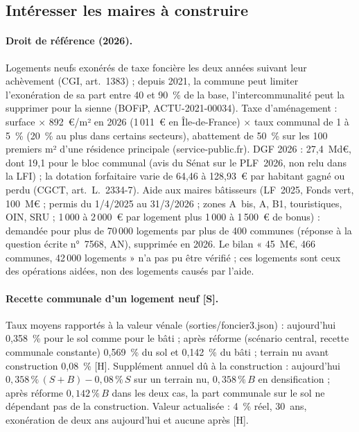 \subsection{Intéresser les maires à construire}\label{ann:pal-maires}

\paragraph{Droit de référence (2026).} Logements neufs exonérés de taxe foncière les deux années suivant leur
achèvement (CGI, art.~1383) ; depuis 2021, la commune peut limiter l'exonération de sa part entre 40 et 90~\% de la
base, l'intercommunalité peut la supprimer pour la sienne (BOFiP, ACTU-2021-00034). Taxe d'aménagement : surface
$\times$ 892~€/m² en 2026 (1\,011~€ en Île-de-France) $\times$ taux communal de 1 à 5~\% (20~\% au plus dans certains
secteurs), abattement de 50~\% sur les 100 premiers m² d'une résidence principale (service-public.fr). DGF 2026 :
27,4~Md€, dont 19,1 pour le bloc communal (avis du Sénat sur le PLF~2026, non relu dans la LFI) ; la dotation forfaitaire
varie de 64,46 à 128,93~€ par habitant gagné ou perdu (CGCT, art.~L.~2334-7). Aide aux maires bâtisseurs (LF~2025,
Fonds vert, 100~M€ ; permis du 1/4/2025 au 31/3/2026 ; zones A~bis, A, B1, touristiques, OIN, SRU ; 1\,000 à 2\,000~€
par logement plus 1\,000 à 1\,500~€ de bonus) : demandée pour plus de 70\,000 logements par plus de 400 communes
(réponse à la question écrite n°~7568, AN), supprimée en 2026. Le bilan « 45~M€, 466 communes, 42\,000 logements » n'a
pas pu être vérifié ; ces logements sont ceux des opérations aidées, non des logements causés par l'aide.

\paragraph{Recette communale d'un logement neuf [S].} Taux moyens rapportés à la valeur vénale (sorties/foncier3.json) :
aujourd'hui 0,358~\% pour le sol comme pour le bâti ; après réforme (scénario central, recette communale constante)
0,569~\% du sol et 0,142~\% du bâti ; terrain nu avant construction 0,08~\% [H]. Supplément annuel dû à la
construction : aujourd'hui $0{,}358\,\%\,(S+B) - 0{,}08\,\%\,S$ sur un terrain nu, $0{,}358\,\%\,B$ en densification ;
après réforme $0{,}142\,\%\,B$ dans les deux cas, la part communale sur le sol ne dépendant pas de la construction.
Valeur actualisée : 4~\% réel, 30~ans, exonération de deux ans aujourd'hui et aucune après [H].

